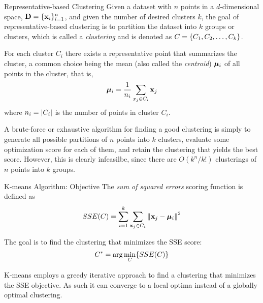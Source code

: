 
\date[Chap 13: Rep-based Clustering]{Chapter 13: Representative-based Clustering}

\begin{frame}
\titlepage
\end{frame}


\begin{frame}{Representative-based Clustering}
Given a dataset with $n$ points in a $d$-dimensional space, $\mathbf{D} =
\{\mathbf{x}_i \}_{i=1}^n$, and given the number of desired clusters $k$, the
goal of representative-based clustering is to partition the dataset into
$k$ groups or clusters, which is called a {\em clustering} and is
denoted as ${\relax C} = \{C_1, C_2, \ldots, C_k\}$. 

\medskip
For each cluster
$C_i$ there exists a representative point that summarizes the cluster, a
common choice being the mean (also called the {\em centroid})
${\bm \mu}_i$ of all points in
the cluster, that is,
\begin{align*}
  {\bm \mu}_i = {1\over n_i} \sum_{x_{j} \in C_i} \mathbf{x}_{j}
\end{align*}
where $n_i = |C_i|$ is the number of points in cluster $C_i$.

\medskip
A brute-force or exhaustive algorithm for f\/{i}nding a good clustering is simply to generate all possible partitions of $n$ points into $k$
clusters, evaluate some optimization score for each of them,
and retain the
clustering that yields the best score.
However, this is clearly infeasilbe, since there are
$O(k^n/k!)$ clusterings of $n$ points into $k$ groups. 
\end{frame}



\begin{frame}{K-means Algorithm: Objective}
The {\em sum of squared errors}
scoring function is def\/{i}ned as
\begin{align*}
  SSE({\relax C}) = \sum_{i=1}^{k}\sum_{\mathbf{x}_{j} \in
  C_{i}}\left\lVert\mathbf{x}_{j}-{\bm \mu}_i\right\rVert^2
\end{align*}

\medskip
The goal is to f\/{i}nd the clustering that minimizes
the SSE score:
\begin{align*}
    {\relax C}^* = \arg \min_{{\relax C}} \{ SSE({\relax C}) \}
\end{align*}

\medskip
K-means
employs a greedy iterative approach to f\/{i}nd a clustering that minimizes
the SSE objective.
As such it can converge to a local optima
instead of a globally optimal clustering.

\end{frame}


